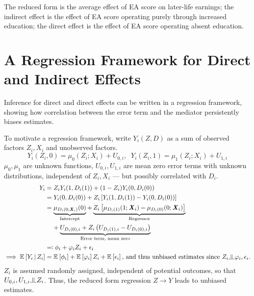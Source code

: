 \documentclass[a4paper, 12pt]{article}                                     %
\renewcommand{\vec}[1]{\boldsymbol{\mathit{#1}}}                           %
\newcommand{\E}[2][]{\mathbb{E}_{#1} \left[ #2 \right]}                    %
\newcommand{\Egiven}[3][]{\mathbb{E}_{#1} \left[ #2 \, \middle\vert \, #3 \right]} %
\newcommand{\indep}{\raisebox{0.05em}{\rotatebox[origin=c]{90}{$\models$}}}%
\begin{document}
The reduced form is the average effect of EA score on later-life earnings;
the indirect effect is the effect of EA score operating purely through increased education; 
the direct effect is the effect of EA score operating absent education. 

\section{A Regression Framework for Direct and Indirect Effects}
Inference for direct and direct effects can be written in a regression framework, showing how correlation between the error term and the mediator persistently biases estimates.

To motivate a regression framework, write $Y_i(Z, D)$ as a sum of observed factors $Z_i, \vec X_i$ and unobserved factors.
\[ Y_i(Z_i, 0)
        = \mu_{0}(Z_i; \vec X_i) + U_{0,i}, \;\;
    Y_i(Z_i, 1)
        = \mu_{1}(Z_i; \vec X_i) + U_{1,i} \]
$\mu_0, \mu_1$ are unknown functions, $U_{0,i}, U_{1,i}$ are mean zero error terms with unknown distributions, independent of $Z_i, \vec X_i$ --- but possibly correlated with $D_i$.
\begin{align*}
    Y_i &= Z_i Y_i(1, D_i(1)) + (1 - Z_i) Y_i(0, D_i(0)) \\
        &= Y_i(0, D_i(0)) +
            Z_i \left[ Y_i(1, D_i(1)) - Y_i(0, D_i(0)) \right] \\
        &= \underbrace{\mu_{D_i(0; \vec X_i)}(0)}_{\text{Intercept}} +
            \underbrace{Z_i \left[ \mu_{D_i(1)}(1; \vec X_i) - \mu_{D_i(0)}(0; \vec X_i) \right]}_{
                \text{Regressor}} \\
        &\;\;\;\; +
            \underbrace{U_{D_i(0), i} + Z_i \left( U_{D_i(1), i} - U_{D_i(0), i} \right)}_{\text{Error term, mean zero}} \\
        &\eqqcolon \phi_i + \varphi_i Z_i + \epsilon_i \\
    \implies \Egiven{Y_i}{Z_i}&=
        \E{\phi_i} + \E{\varphi_i} Z_i + \E{\epsilon_i}
        \text{, and thus unbiased estimates since } Z_i \indep \varphi_i, \epsilon_i.
\end{align*}
$Z_i$ is assumed randomly assigned, independent of potential outcomes, so that $U_{0,i}, U_{1,i} \indep Z_i$.
Thus, the reduced form regression $Z \to Y$ leads to unbiased estimates.
\end{document}
